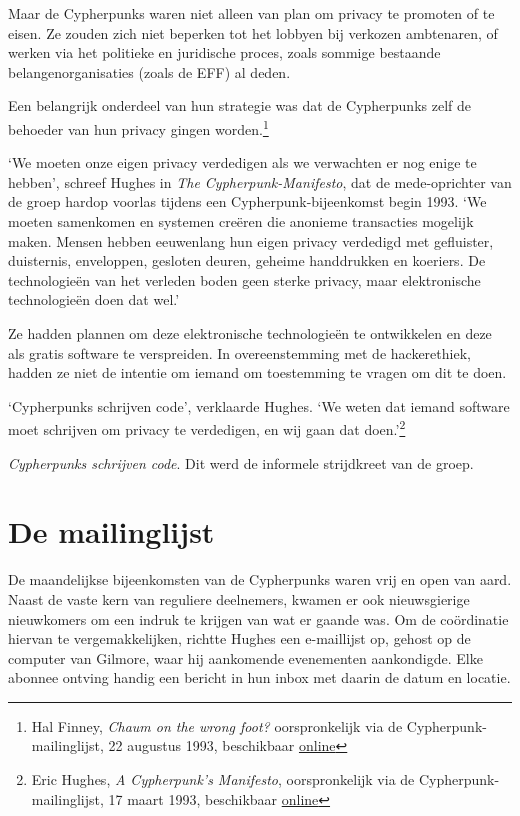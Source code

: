 \documentclass[
  a5paper,
  smalldemyvopaper,11pt,twoside,onecolumn,openright,extrafontsizes,
hidelinks]{memoir}
\begin{document}
Maar de Cypherpunks waren niet alleen van plan om privacy te promoten of
te eisen. Ze zouden zich niet beperken tot het lobbyen bij verkozen
ambtenaren, of werken via het politieke en juridische proces, zoals
sommige bestaande belangenorganisaties (zoals de EFF) al deden.

Een belangrijk onderdeel van hun strategie was dat de Cypherpunks zelf
de behoeder van hun privacy gingen worden.\footnote{Hal Finney,
  \emph{Chaum on the wrong foot?} oorspronkelijk via de
  Cypherpunk-mailinglijst, 22 augustus 1993, beschikbaar
  \href{https://cypherpunks.venona.com/date/1993/08/msg00652.html}{online}}

`We moeten onze eigen privacy verdedigen als we verwachten er nog enige
te hebben', schreef Hughes in \emph{The Cypherpunk-Manifesto}, dat de
mede-oprichter van de groep hardop voorlas tijdens een
Cypherpunk-bijeenkomst begin 1993. `We moeten samenkomen en systemen
creëren die anonieme transacties mogelijk maken. Mensen hebben
eeuwenlang hun eigen privacy verdedigd met gefluister, duisternis,
enveloppen, gesloten deuren, geheime handdrukken en koeriers. De
technologieën van het verleden boden geen sterke privacy, maar
elektronische technologieën doen dat wel.'

Ze hadden plannen om deze elektronische technologieën te ontwikkelen en
deze als gratis software te verspreiden. In overeenstemming met de
hackerethiek, hadden ze niet de intentie om iemand om toestemming te
vragen om dit te doen.

`Cypherpunks schrijven code', verklaarde Hughes. `We weten dat iemand
software moet schrijven om privacy te verdedigen, en wij gaan dat
doen.'\footnote{Eric Hughes, \emph{A Cypherpunk's Manifesto},
  oorspronkelijk via de Cypherpunk-mailinglijst, 17 maart 1993,
  beschikbaar
  \href{https://cypherpunks.venona.com/date/1993/03/msg00392.html}{online}}

\emph{Cypherpunks schrijven code}. Dit werd de informele strijdkreet van
de groep.

\section{De mailinglijst}\label{de-mailinglijst}

De maandelijkse bijeenkomsten van de Cypherpunks waren vrij en open van
aard. Naast de vaste kern van reguliere deelnemers, kwamen er ook
nieuwsgierige nieuwkomers om een indruk te krijgen van wat er gaande
was. Om de coördinatie hiervan te vergemakkelijken, richtte Hughes een
e-maillijst op, gehost op de computer van Gilmore, waar hij aankomende
evenementen aankondigde. Elke abonnee ontving handig een bericht in hun
inbox met daarin de datum en locatie.
\end{document}
